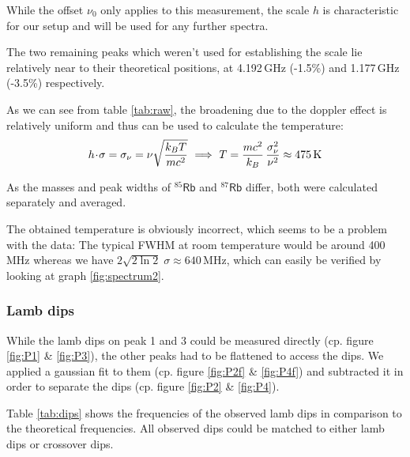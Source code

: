 While the offset $\nu_0$ only applies to this measurement, the scale $h$ is characteristic for our setup and will be used for any further spectra.

\newpage
The two remaining peaks which weren't used for establishing the scale lie relatively near to their theoretical positions, at 4.192\,GHz (-1.5\%) and 1.177\,GHz (-3.5\%) respectively.

As we can see from table \ref{tab:raw}, the broadening due to the doppler effect is relatively uniform and thus can be used to calculate the temperature:
\begin{equation}
 h \!\cdot\! \sigma = \sigma_\nu = \nu \sqrt{\frac{k_B T}{m c^2}} ~\Longrightarrow~
T = \frac{m c^2}{k_B} \, \frac{\sigma_\nu^2}{\nu^2} \approx 475\,\kelvin
\end{equation}

As the masses and peak widths of $^{85}\mathsf{Rb}$ and $^{87}\mathsf{Rb}$ differ, both were calculated separately and averaged.

The obtained temperature is obviously incorrect, which seems to be a problem with the data: The typical FWHM at room temperature would be around 400\,MHz whereas we have  $2 \sqrt{2 \ln 2} \; \sigma \approx 640\,$MHz, which can easily be verified by looking at graph \ref{fig:spectrum2}.




\newpage
\subsubsection{Lamb dips}

While the lamb dips on peak 1 and 3 could be measured directly (cp. figure \ref{fig:P1} \& \ref{fig:P3}), the other peaks had to be flattened to access the dips. We applied a gaussian fit to them  (cp. figure \ref{fig:P2f} \& \ref{fig:P4f}) and subtracted it in order to separate the dips (cp. figure \ref{fig:P2} \& \ref{fig:P4}).

Table \ref{tab:dips} shows the frequencies of the observed lamb dips in comparison to the theoretical frequencies. All observed dips could be matched to either lamb dips or crossover dips.

